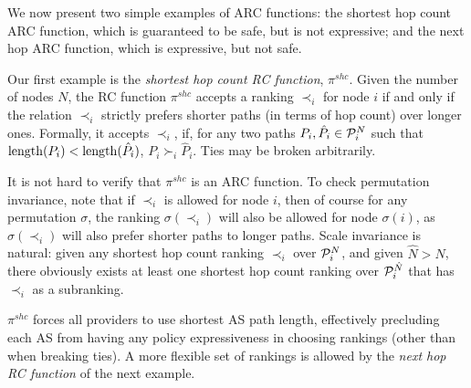 
We now present two simple examples of ARC functions: the
shortest hop count ARC function, which is guaranteed to be safe, but is not
expressive; and the next hop ARC function, which is expressive, but not safe. 

\begin{example}
Our first example is the {\em shortest hop count RC function},
$\pi^{shc}$.  Given the number of nodes $N$, the RC function
$\pi^{shc}$ accepts a ranking $\prec_i$ for node $i$ if and
only if the relation $\prec_i$ strictly prefers shorter paths (in terms
of hop count) over longer ones.  Formally, it accepts $\prec_i$, if,
for any two paths $P_i, \hat{P}_i \in \P_i^N$ such that $\length(P_i) <
\length(\hat{P}_i)$, $P_i \succ_i \hat{P}_i$.  Ties may be broken
arbitrarily.

It is not hard to verify that $\pi^{shc}$ is an ARC function.  To check
permutation invariance, note that if $\prec_i$ is allowed for node $i$,
then of course for any permutation $\sigma$, the ranking
$\sigma(\prec_i)$ will also be allowed for node $\sigma(i)$, as
$\sigma(\prec_i)$ will also prefer shorter paths to longer paths.  Scale
invariance is natural: given any shortest hop count ranking $\prec_i$
over $\P_i^N$, and given $\hat{N} > N$, there obviously exists at least
one shortest hop count ranking over $\P_i^{\hat{N}}$ that has $\prec_i$
as a subranking.
\end{example}

$\pi^{shc}$ forces all providers to use shortest AS path
length, effectively precluding each AS from having any policy
expressiveness in choosing rankings (other than when breaking ties).  A more 
flexible set of rankings is allowed by the {\em next hop RC function} of
the next example. 


